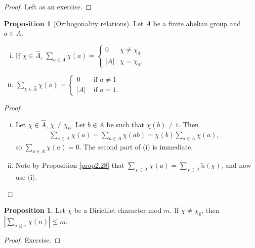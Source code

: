 \documentclass{article}
\theoremstyle{definition}
\newtheorem{prop}[theorem]{Proposition}
\begin{document}
\begin{proof}
    Left as an exercise.
\end{proof}
\begin{prop}[Orthogonality relations]\label{prop2.30}
    Let $A$ be a finite abelian group and $a \in A$. 
    \begin{enumerate}[(i)]
        \item If $\chi \in \widehat{A}$, $\sum_{a \in A}^{} \chi(a) = \begin{cases}
            0 & \chi \neq \chi_0\\
            \left|A\right| & \chi = \chi_0.
        \end{cases}$
        \item $\sum_{\chi \in \widehat{A}}^{} \chi(a)= \begin{cases}
            0 & \text{ if }a \neq 1\\
            \left|A\right| & \text{ if } a = 1.
        \end{cases}$
    \end{enumerate}
\end{prop}
\begin{proof}
    \begin{enumerate}[(i)]
        \item Let $\chi \in \widehat{A}$, $\chi \neq \chi_0$. Let $b \in A$ be such that $\chi(b) \neq 1$. Then 
        \begin{align*}
            \sum_{a \in A}^{} \chi(a) = \sum_{a \in A}^{} \chi(ab) = \chi(b) \sum_{a \in A}^{} \chi(a),
        \end{align*}
        so $\sum_{a \in A}^{} \chi(a) = 0$. The second part of (i) is immediate.
        \item Note by Proposition \ref{prop2.28} that  $\sum_{\chi \in \widehat{A}}^{} \chi(a) = \sum_{\chi \in \widehat{A}}^{} \tilde{a}(\chi)$, and now use (i).
    \end{enumerate}
\end{proof}
\begin{prop}\label{prop2.31}
    Let $\chi$ be a Dirichlet character mod $m$. If $\chi \neq \chi_0$, then $\left|\sum_{n\le x}^{} \chi(n)\right|\le m$.
\end{prop}
\begin{proof}
    Exercise.
\end{proof}
\end{document}
